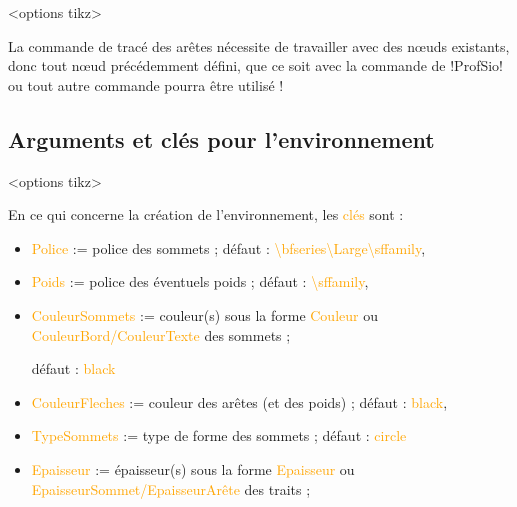 \documentclass[french,a4paper,11pt]{article}
\newcommand\Cle[1]{{\small\sffamily\textlangle \textcolor{orange}{#1}\textrangle}}
\begin{document}
{{\begin{DemoCode}
\begin{GrapheTikz}[clés]<options tikz>
\end{GrapheTikz}
\end{DemoCode}

\begin{tipblock}
La commande de tracé des arêtes nécessite de travailler avec des nœuds existants, donc tout nœud précédemment défini, que ce soit avec la commande de \packagetex!ProfSio! ou tout autre commande pourra être utilisé !
\end{tipblock}

\subsection{Arguments et clés pour l'environnement}

\begin{DemoCode}
\begin{GrapheTikz}[clés]<options tikz>
\end{GrapheTikz}
\end{DemoCode}

\begin{tipblock}
En ce qui concerne la création de l'environnement, les \Cle{clés} sont :

\begin{itemize}
	\item \Cle{Police} := police des sommets ; \hfill{}défaut : \Cle{\textbackslash bfseries\textbackslash Large\textbackslash sffamily},%
	\item \Cle{Poids} := police des éventuels poids ; \hfill{}défaut : \Cle{\textbackslash sffamily},%
	\item \Cle{CouleurSommets} := couleur(s) sous la forme \Cle{Couleur} ou \Cle{CouleurBord/CouleurTexte} des sommets ;
	
	\hfill{}défaut : \Cle{black}
	\item \Cle{CouleurFleches} := couleur des arêtes (et des poids) ; \hfill{}défaut : \Cle{black},%
	\item \Cle{TypeSommets} := type de forme des sommets ; \hfill{}défaut : \Cle{circle}
	\item \Cle{Epaisseur} := épaisseur(s) sous la forme \Cle{Epaisseur} ou \Cle{EpaisseurSommet/EpaisseurArête} des traits ;
	

\end{itemize}
\end{tipblock}}}
\end{document}
